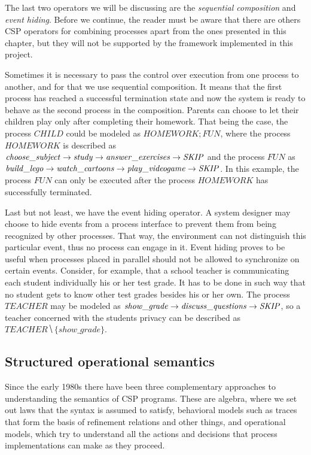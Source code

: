 The last two operators we will be discussing are the \emph{sequential composition} and \emph{event hiding}. Before we continue, the reader must be aware that there are others CSP operators for combining processes apart from the ones presented in this chapter, but they will not be supported by the framework implemented in this project.

Sometimes it is necessary to pass the control over execution from one process to another, and for that we use sequential composition. It means that the first process has reached a successful termination state and now the system is ready to behave as the second process in the composition. Parents can choose to let their children play only after completing their homework. That being the case, the process $ \mathit{CHILD} $ could be modeled as $ \mathit{HOMEWORK}\!; \mathit{FUN} $, where the process $ \mathit{HOMEWORK} $ is described as $ \mathit{choose\_subject} \mathrel{\rightarrow} \mathit{study} \mathrel{\rightarrow} \mathit{answer\_exercises} \mathrel{\rightarrow} \mathit{\mathord{{SKIP}}} $ and the process $ \mathit{FUN} $ as $ \mathit{build\_lego} \mathrel{\rightarrow} \mathit{watch\_cartoons} \mathrel{\rightarrow} \mathit{play\_videogame} \mathrel{\rightarrow} \mathit{\mathord{{SKIP}}} $. In this example, the process $ \mathit{FUN} $ can only be executed after the process $ \mathit{HOMEWORK} $ has successfully terminated.

Last but not least, we have the event hiding operator. A system designer may choose to hide events from a process interface to prevent them from being recognized by other processes. That way, the environment can not distinguish this particular event, thus no process can engage in it. Event hiding proves to be useful when processes placed in parallel should not be allowed to synchronize on certain events. Consider, for example, that a school teacher is communicating each student individually his or her test grade. It has to be done in such way that no student gets to know other test grades besides his or her own. The process $ \mathit{TEACHER} $ may be modeled as $ \mathit{show\_grade} \mathrel{\rightarrow} \mathit{discuss\_questions} \mathrel{\rightarrow} \mathit{\mathord{{SKIP}}} $, so a teacher concerned with the students privacy can be described as $ \mathit{TEACHER} \hide \{show\_grade\} $.

\subsection{Structured operational semantics}

Since the early 1980s there have been three complementary approaches to understanding the semantics of CSP programs. These are algebra, where we set out laws that the syntax is assumed to satisfy, behavioral models such as traces that form the basis of refinement relations and other things, and operational models, which try to understand all the actions and decisions that process implementations can make as they proceed.

